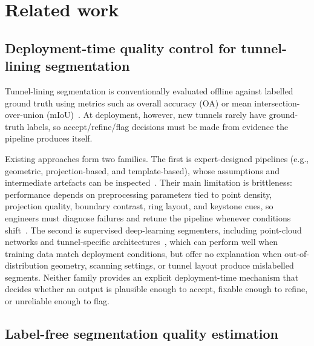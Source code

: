 \documentclass[a4paper,fleqn]{cas-dc}
\begin{document}
\section{Related work}\label{sec:related}

\subsection{Deployment-time quality control for tunnel-lining segmentation}

Tunnel-lining segmentation is conventionally evaluated offline against labelled ground truth using metrics such as overall accuracy (OA) or mean intersection-over-union (mIoU)~\cite{lin2024seg2tunnel}. At deployment, however, new tunnels rarely have ground-truth labels, so accept/refine/flag decisions must be made from evidence the pipeline produces itself.

Existing approaches form two families. The first is expert-designed pipelines (e.g., geometric, projection-based, and template-based), whose assumptions and intermediate artefacts can be inspected~\cite{attard2018tunnelInspectionReview,montero2015roboticTunnelInspection}. Their main limitation is brittleness: performance depends on preprocessing parameters tied to point density, projection quality, boundary contrast, ring layout, and keystone cues, so engineers must diagnose failures and retune the pipeline whenever conditions shift~\cite{huang2021bimMlUnderground,sjolander2023automatedTunnelInspections}. The second is supervised deep-learning segmenters, including point-cloud networks and tunnel-specific architectures~\cite{hu2020randlanet,thomas2019kpconv,zhang2022unrollingnet,ji2023spcnet,zhou2023aspcnet}, which can perform well when training data match deployment conditions, but offer no explanation when out-of-distribution geometry, scanning settings, or tunnel layout produce mislabelled segments. Neither family provides an explicit deployment-time mechanism that decides whether an output is plausible enough to accept, fixable enough to refine, or unreliable enough to flag.

\subsection{Label-free segmentation quality estimation}
\end{document}

